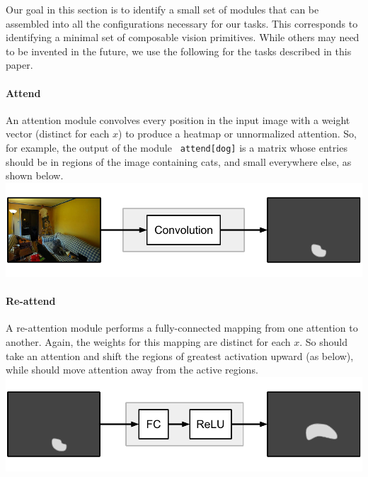 \documentclass[10pt,twocolumn,letterpaper]{article}
\begin{document}
Our goal in this section is to identify a small set of modules that can be
assembled into all the configurations necessary for our tasks. This corresponds
to identifying a minimal set of composable vision primitives. While others  may
need to be invented in the future, we use the following for the tasks described
in this paper.\\

\paragraph{Attend}

An attention module  convolves every position in the input
image with a weight vector (distinct for each $x$) to produce a heatmap or
unnormalized attention. So, for example, the output of the module {\small\tt
attend[dog]} is a matrix whose entries should be in regions of the image
containing cats, and small everywhere else, as shown below.\\[1em]
\includegraphics[width=\columnwidth]{fig/attend}

\paragraph{Re-attend}

A re-attention module  performs a fully-connected mapping
from one attention to another. Again, the weights for this mapping are distinct
for each $x$. So  should take an attention and shift the
regions of greatest activation upward (as below), while 
should move attention away from the active regions.\\[1em]
\includegraphics[width=\columnwidth]{fig/re-attend}
\end{document}

